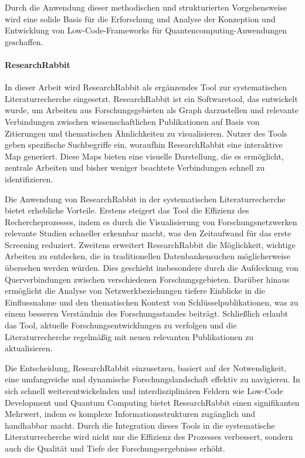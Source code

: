 Durch die Anwendung dieser 
methodischen und strukturierten Vorgehensweise wird eine solide Basis für die Erforschung 
und Analyse der Konzeption und Entwicklung von Low-Code-Frameworks für 
Quantencomputing-Anwendungen geschaffen.

\paragraph{ResearchRabbit}
In dieser Arbeit wird ResearchRabbit als ergänzendes Tool zur systematischen Literaturrecherche eingesetzt. 
ResearchRabbit ist ein Softwaretool, das entwickelt wurde, um Arbeiten aus Forschungsgebieten als Graph darzustellen 
und relevante Verbindungen zwischen wissenschaftlichen Publikationen auf Basis von Zitierungen und thematischen 
Ähnlichkeiten zu visualisieren.\cite{cole2023researchrabbit} Nutzer des Tools geben spezifische Suchbegriffe ein, woraufhin ResearchRabbit eine 
interaktive Map generiert. Diese Maps bieten eine visuelle Darstellung, die es ermöglicht, 
zentrale Arbeiten und bisher weniger beachtete Verbindungen schnell zu identifizieren.

Die Anwendung von ResearchRabbit in der systematischen Literaturrecherche bietet erhebliche Vorteile. Erstens 
steigert das Tool die Effizienz des Rechercheprozesses, indem es durch die Visualisierung von Forschungsnetzwerken 
relevante Studien schneller erkennbar macht, was den Zeitaufwand für das erste Screening reduziert. Zweitens 
erweitert ResearchRabbit die Möglichkeit, wichtige Arbeiten zu entdecken, die in traditionellen Datenbankensuchen 
möglicherweise übersehen werden würden. Dies geschieht insbesondere durch die Aufdeckung von Querverbindungen 
zwischen verschiedenen Forschungsgebieten. Darüber hinaus ermöglicht die Analyse von Netzwerkbeziehungen 
tiefere Einblicke in die Einflussnahme und den thematischen Kontext von Schlüsselpublikationen, was zu einem 
besseren Verständnis des Forschungsstandes beiträgt. Schließlich erlaubt das Tool, aktuelle Forschungsentwicklungen 
zu verfolgen und die Literaturrecherche regelmäßig mit neuen relevanten Publikationen zu aktualisieren.

Die Entscheidung, ResearchRabbit einzusetzen, basiert auf der Notwendigkeit, eine umfangreiche und 
dynamische Forschungslandschaft effektiv zu navigieren. In sich schnell weiterentwickelnden und interdisziplinären 
Feldern wie Low-Code Development und Quantum Computing bietet ResearchRabbit einen signifikanten Mehrwert, 
indem es komplexe Informationsstrukturen zugänglich und handhabbar macht. Durch die Integration dieses Tools 
in die systematische Literaturrecherche wird nicht nur die Effizienz des Prozesses verbessert, sondern auch 
die Qualität und Tiefe der Forschungsergebnisse erhöht.

